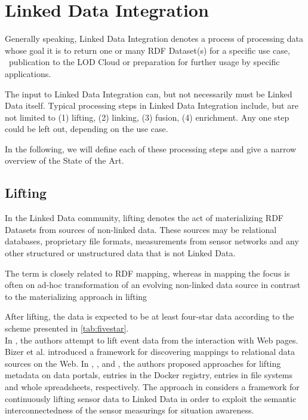 \section{Linked Data Integration}
\label{sec:ldi}

Generally speaking, Linked Data Integration denotes a process of processing data whose goal it is to return one or many \ac{RDF} Dataset(s) for a specific use case, \eg~publication to the \ac{LOD} Cloud or preparation for further usage by specific applications.

The input to Linked Data Integration can, but not necessarily must be Linked Data itself.
Typical processing steps in Linked Data Integration include, but are not limited to (1) lifting, (2) linking, (3) fusion, (4) enrichment.
Any one step could be left out, depending on the use case.

In the following, we will define each of these processing steps and give a narrow overview of the State of the Art.

\subsection{Lifting}
\label{ssec:lifting}
In the Linked Data community, lifting denotes the act of materializing \ac{RDF} Datasets from sources of non-linked data.
These sources may be relational databases, proprietary file formats, measurements from sensor networks and any other structured or unstructured data that is not Linked Data.

The term is closely related to \ac{RDF} mapping, whereas in mapping the focus is often on ad-hoc transformation of an evolving non-linked data source in contrast to the materializing approach in lifting

After lifting, the data is expected to be at least four-star data according to the scheme presented in \autoref{tab:fivestar}.\\

In \cite{stuhmer:2009a}, the authors attempt to lift event data from the interaction with Web pages.
Bizer et al.\cite{bizer:2010a} introduced a framework for discovering mappings to relational data sources on the Web.
In \cite{neumaier:2017a}, \cite{ayed:2017a}, \cite{schandl:2010a} and \cite{fiorelli:2015a}, the authors proposed approaches for lifting metadata on data portals, entries in the Docker registry, entries in file systems and whole spreadsheets, respectively.
The approach in \cite{hasan:2011a} considers a framework for continuously lifting sensor data to Linked Data in order to exploit the semantic interconnectedness of the sensor measurings for situation awareness.

